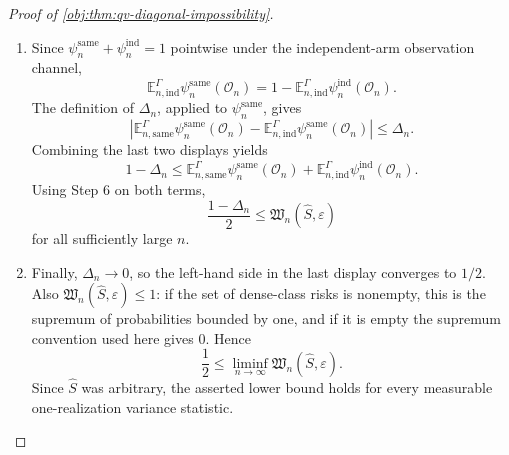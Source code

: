 \documentclass[11pt]{article}
\begin{document}
\begin{proof}[Proof of \cref{obj:thm:qv-diagonal-impossibility}]
\begin{enumerate}
\item Since \(\psi_n^{\mathrm{same}}+\psi_n^{\mathrm{ind}}=1\) pointwise under the independent-arm observation channel,
\[
\mathbb E_{n,\mathrm{ind}}^{\Gamma}\psi_n^{\mathrm{same}}(\mathcal O_n)
=
1-\mathbb E_{n,\mathrm{ind}}^{\Gamma}\psi_n^{\mathrm{ind}}(\mathcal O_n).
\]
The definition of \(\Delta_n\), applied to \(\psi_n^{\mathrm{same}}\), gives
\[
\left|
\mathbb E_{n,\mathrm{same}}^{\Gamma}\psi_n^{\mathrm{same}}(\mathcal O_n)
-
\mathbb E_{n,\mathrm{ind}}^{\Gamma}\psi_n^{\mathrm{same}}(\mathcal O_n)
\right|
\le \Delta_n.
\]
Combining the last two displays yields
\[
1-\Delta_n
\le
\mathbb E_{n,\mathrm{same}}^{\Gamma}\psi_n^{\mathrm{same}}(\mathcal O_n)
+
\mathbb E_{n,\mathrm{ind}}^{\Gamma}\psi_n^{\mathrm{ind}}(\mathcal O_n).
\]
Using Step 6 on both terms,
\[
\frac{1-\Delta_n}{2}
\le
\mathfrak W_n(\widehat S,\varepsilon)
\]
for all sufficiently large \(n\). %

\item Finally, \(\Delta_n\to0\), so the left-hand side in the last display converges to \(1/2\). Also \(\mathfrak W_n(\widehat S,\varepsilon)\le1\): if the set of dense-class risks is nonempty, this is the supremum of probabilities bounded by one, and if it is empty the supremum convention used here gives \(0\). Hence
\[
\frac12
\le
\liminf_{n\to\infty}\mathfrak W_n(\widehat S,\varepsilon).
\]
Since \(\widehat S\) was arbitrary, the asserted lower bound holds for every measurable one-realization variance statistic. %
\end{enumerate}
\end{proof}




\end{document}
